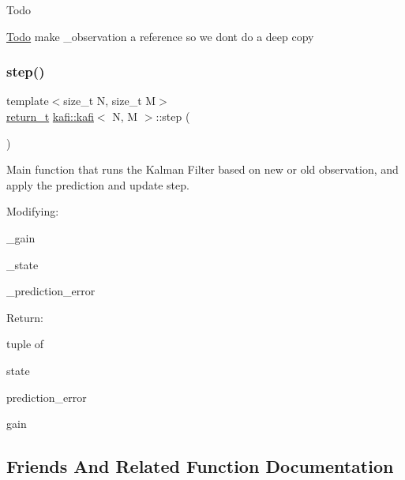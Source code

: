 \begin{DoxyRefDesc}{Todo}
\item[\hyperlink{todo__todo000004}{Todo}]make {\ttfamily \+\_\+observation} a reference so we don\textquotesingle{}t do a deep copy \end{DoxyRefDesc}
\mbox{\label{classkafi_1_1kafi_ae78f8f011e499e806294d6e6575a47c3}} 
\subsubsection{\texorpdfstring{step()}{step()}}
{\footnotesize\ttfamily template$<$size\+\_\+t N, size\+\_\+t M$>$ \\
\hyperlink{classkafi_1_1kafi_a7dcd4a6f44ce454d56328f38ab053927}{return\+\_\+t} \hyperlink{classkafi_1_1kafi}{kafi\+::kafi}$<$ N, M $>$\+::step (\begin{DoxyParamCaption}{ }\end{DoxyParamCaption})\hspace{0.3cm}{\ttfamily [inline]}}



Main function that runs the Kalman Filter based on new or old observation, and apply the prediction and update step. 

Modifying\+:
\begin{DoxyItemize}
\item {\ttfamily \+\_\+gain}
\item {\ttfamily \+\_\+state}
\item {\ttfamily \+\_\+prediction\+\_\+error}
\end{DoxyItemize}

Return\+:
\begin{DoxyItemize}
\item tuple of
\begin{DoxyItemize}
\item state
\item prediction\+\_\+error
\item gain 
\end{DoxyItemize}
\end{DoxyItemize}

\subsection{Friends And Related Function Documentation}
\mbox{\label{classkafi_1_1kafi_a648211fb566ac0cd37c803ea98783193}} 
